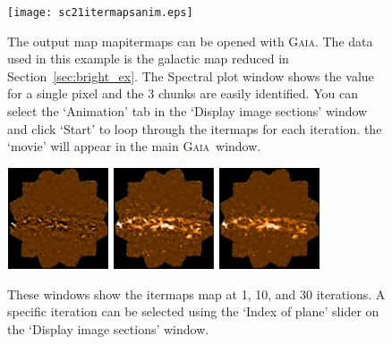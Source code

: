 \documentclass[twoside,11pt]{article}
\newenvironment{latexonly}{}{}
\newcommand{\xref}[3]{#1}
\renewcommand{\_}{\texttt{\symbol{95}}}
\newenvironment{fmpage}[1]{\begin{lrbox}{\fmbox}\begin{minipage}{#1}}{\end{minipage}\end{lrbox}\fbox{\usebox{\fmbox}}}
\newcommand{\gaia}{\xref{\textsc{Gaia}}{sun214}{}}
\begin{document}
\begin{latexonly}
\begin{figure}[ht!]
\begin{center}
\begin{fmpage}{0.95\linewidth}
\vspace{0.5cm}

\begin{minipage}[c]{0.65\linewidth}
\centering
\texttt{[image: sc21\_itermaps\_anim.eps]}

\end{minipage}
\hspace{0.3cm}
\begin{minipage}[c]{0.29\linewidth}
The output map map\_itermaps can be opened with \gaia. The data used
in this example is the galactic map reduced in
Section~\ref{sec:bright_ex}. The Spectral plot window shows the value
for a single pixel and the 3 chunks are easily identified. You can
select the `Animation' tab in the `Display image sections' window and
click `Start' to loop through the itermaps for each iteration. the
`movie' will appear in the main \gaia\ window.
\end{minipage}

\vspace{0.7cm}

\begin{minipage}[c]{0.65\linewidth}
\centering
\hspace{0.5mm}
\includegraphics[width=3cm, height=3cm]{sc21_iter1.eps}
\includegraphics[width=3cm, height=3cm]{sc21_iter2.eps}
\includegraphics[width=3cm, height=3cm]{sc21_iter31.eps}
\vspace{0.2cm}
\end{minipage}
\hspace{0.3cm}
\begin{minipage}[c]{0.29\linewidth}
These windows show the itermaps map at 1, 10, and 30 iterations. A
specific iteration can be selected using the `Index of plane' slider
on the `Display image sections' window.
\vspace{0.2cm}
\end{minipage}


\end{fmpage}
\end{center}
\end{figure}
\end{latexonly}
\end{document}
